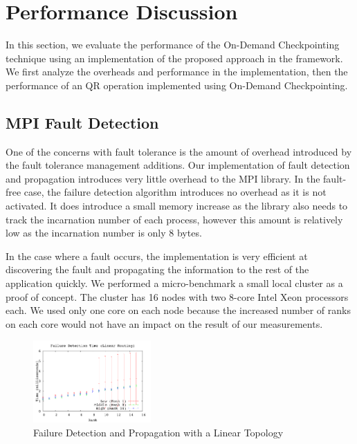 \section{Performance Discussion}\label{sec:experiments}

In this section, we evaluate the performance of the On-Demand
Checkpointing technique using an implementation of the proposed
approach in the \ompi framework. We first analyze the overheads and
performance in the \ompi implementation, then the performance of an
\abft QR operation implemented using On-Demand Checkpointing.

\subsection{MPI Fault Detection}

One of the concerns with fault tolerance is the amount of overhead
introduced by the fault tolerance management additions. Our
implementation of fault detection and propagation introduces very
little overhead to the MPI library. In the fault-free case, the
failure detection algorithm introduces no overhead as it is not
activated. It does introduce a small memory increase as the library
also needs to track the incarnation number of each process, however
this amount is relatively low as the incarnation number is only 8
bytes.

In the case where a fault occurs, the implementation is very efficient at
discovering the fault and propagating the information to the rest of the
application quickly. We performed a micro-benchmark a small local cluster as a
proof of concept. The cluster has 16 nodes with two 8-core Intel Xeon processors
each. We used only one core on each node because the increased number of ranks
on each core would not have an impact on the result of our measurements.

\begin{figure}[htb]
    \centering
    \includegraphics[width=0.4\textwidth]{figures/failure_detection_linear_errbars}
    \caption{Failure Detection and Propagation with a Linear Topology}
    \label{fig:linear}
\end{figure}

